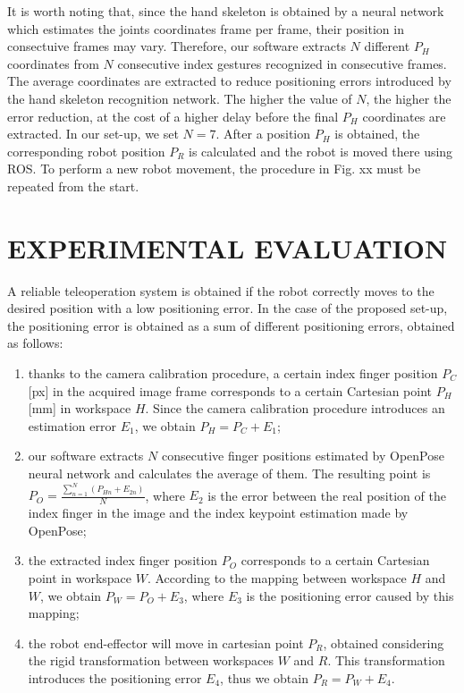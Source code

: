 \documentclass[letterpaper, 10 pt, conference]{ieeeconf}  %
\begin{document}
It is worth noting that, since the hand skeleton is obtained by a neural network which estimates the joints coordinates frame per frame, their position in consectuive frames may vary. Therefore, our software extracts $N$ different $P_H$ coordinates from $N$ consecutive index gestures recognized in consecutive frames. The average coordinates are extracted to reduce positioning errors introduced by the hand skeleton recognition network. The higher the value of $N$, the higher the error reduction, at the cost of a higher delay before the final $P_H$ coordinates are extracted. In our set-up, we set $N = 7$.
After a position $P_H$ is obtained, the corresponding robot position $P_R$ is calculated and the robot is moved there using ROS.
To perform a new robot movement, the procedure in Fig. xx must be repeated from the start.

\section{EXPERIMENTAL EVALUATION}\label{sec:experiments}
A reliable teleoperation system is obtained if the robot correctly moves to the desired position with a low positioning error. In the case of the proposed set-up, the positioning error is obtained as a sum of different positioning errors, obtained as follows:
\begin{enumerate}
\item thanks to the camera calibration procedure, a certain index finger position $P_C$ [px] in the acquired image frame corresponds to a certain Cartesian point $P_H$ [mm] in workspace $H$. Since the camera calibration procedure introduces an estimation error $E_1$, we obtain $P_H = P_C + E_1$;
\item our software extracts $N$ consecutive finger positions estimated by OpenPose neural network and calculates the average of them. The resulting point is $P_O = \frac{\sum_{n=1}^{N}(P_{Hn} + E_{2n})}{N}$, where $E_2$ is the error between the real position of the index finger in the image and the index keypoint estimation made by OpenPose;
\item the extracted index finger position $P_O$ corresponds to a certain Cartesian point in workspace $W$. According to the mapping between workspace $H$ and $W$, we obtain $P_W = P_O + E_3$, where $E_3$ is the positioning error caused by this mapping;
\item the robot end-effector will move in cartesian point $P_R$, obtained considering the rigid transformation between workspaces $W$ and $R$. This transformation introduces the positioning error $E_4$, thus we obtain $P_R = P_W + E_4$.
\end{enumerate}
\end{document}
